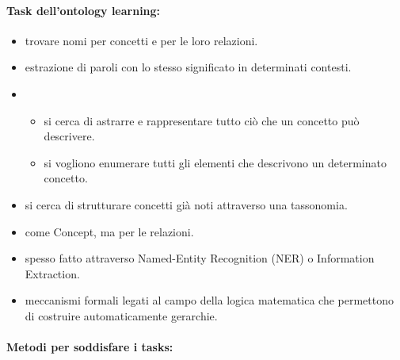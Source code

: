 \paragraph{Task dell'ontology learning:}

\begin{itemize}
  \item {} trovare nomi per concetti e per le loro relazioni. 
  \item {} estrazione di paroli con lo stesso significato in determinati contesti. 
  \item {} 
    \begin{itemize}
      \item {} si cerca di astrarre e rappresentare tutto ciò che un concetto può descrivere. 
      \item {} si vogliono enumerare tutti gli elementi che descrivono un determinato concetto.
    \end{itemize}
  \item {} si cerca di strutturare concetti già noti attraverso una tassonomia. 
  \item {} come Concept, ma per le relazioni. 
  \item {} spesso fatto attraverso Named-Entity Recognition (NER) o Information Extraction. 
  \item {} meccanismi formali legati al campo della logica matematica che permettono di costruire automaticamente gerarchie.
\end{itemize}

\paragraph{Metodi per soddisfare i tasks:}

